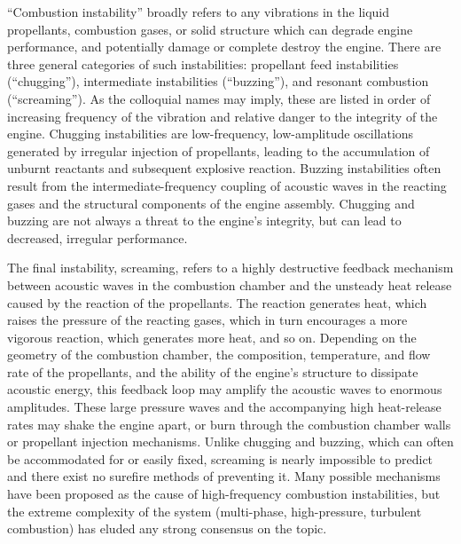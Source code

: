 ``Combustion instability'' broadly refers to any vibrations in the liquid propellants, combustion gases, or solid structure which can degrade engine performance, and potentially damage or complete destroy the engine. There are three general categories of such instabilities: propellant feed instabilities (``chugging''), intermediate instabilities (``buzzing''), and resonant combustion (``screaming''). As the colloquial names may imply, these are listed in order of increasing frequency of the vibration and relative danger to the integrity of the engine. Chugging instabilities are low-frequency, low-amplitude oscillations generated by irregular injection of propellants, leading to the accumulation of unburnt reactants and subsequent explosive reaction. Buzzing instabilities often result from the intermediate-frequency coupling of acoustic waves in the reacting gases and the structural components of the engine assembly. Chugging and buzzing are not always a threat to the engine's integrity, but can lead to decreased, irregular performance.

The final instability, screaming, refers to a highly destructive feedback mechanism between acoustic waves in the combustion chamber and the unsteady heat release caused by the reaction of the propellants. The reaction generates heat, which raises the pressure of the reacting gases, which in turn encourages a more vigorous reaction, which generates more heat, and so on. Depending on the geometry of the combustion chamber, the composition, temperature, and flow rate of the propellants, and the ability of the engine's structure to dissipate acoustic energy, this feedback loop may amplify the acoustic waves to enormous amplitudes. These large pressure waves and the accompanying high heat-release rates may shake the engine apart, or burn through the combustion chamber walls or propellant injection mechanisms. Unlike chugging and buzzing, which can often be accommodated for or easily fixed, screaming is nearly impossible to predict and there exist no surefire methods of preventing it. Many possible mechanisms have been proposed as the cause of high-frequency combustion instabilities, but the extreme complexity of the system (multi-phase, high-pressure, turbulent combustion) has eluded any strong consensus on the topic.

